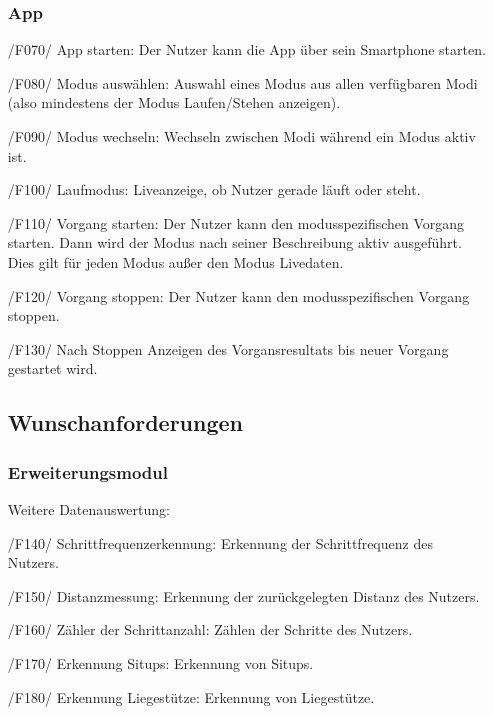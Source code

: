 \documentclass[a4paper,12pt]{article}
\begin{document}
\begin{itemize}
    \subsubsection{App}
      \item[/F070/] \textsf{App starten:} Der Nutzer kann die App über sein Smartphone starten. %
      \item[/F080/] \textsf{Modus auswählen:} Auswahl eines Modus aus allen verfügbaren Modi (also mindestens der Modus \glqq Laufen/Stehen anzeigen\grqq). 
      \item[/F090/] \textsf{Modus wechseln:} Wechseln zwischen Modi während ein Modus aktiv ist. %
      \item[/F100/] \textsf{Laufmodus:} Liveanzeige, ob Nutzer gerade \glqq läuft\grqq{} oder \glqq steht\grqq{}.
      \item[/F110/] \textsf{Vorgang starten:} Der Nutzer kann den modusspezifischen Vorgang starten. Dann wird der Modus nach seiner Beschreibung aktiv ausgeführt. Dies gilt für jeden Modus außer den Modus \glqq Livedaten\grqq.
      \item[/F120/] \textsf{Vorgang stoppen:} Der Nutzer kann den modusspezifischen Vorgang stoppen.
      \item[/F130/] Nach Stoppen Anzeigen des Vorgansresultats bis neuer Vorgang gestartet wird.
  \subsection{Wunschanforderungen}
    \subsubsection{Erweiterungsmodul}
      Weitere Datenauswertung:
      \item[/F140/] \textsf{Schrittfrequenzerkennung:} Erkennung der Schrittfrequenz des Nutzers.
      \item[/F150/] \textsf{Distanzmessung:} Erkennung der zurückgelegten Distanz des Nutzers.
      \item[/F160/] \textsf{Zähler der Schrittanzahl:} Zählen der Schritte des Nutzers.
      \item[/F170/] \textsf{Erkennung Situps:} Erkennung von Situps.
      \item[/F180/] \textsf{Erkennung Liegestütze:} Erkennung von Liegestütze.

\end{itemize}
\end{document}
